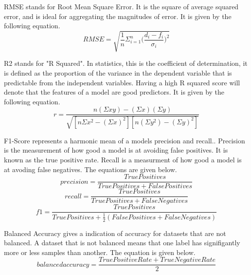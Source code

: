 \par
RMSE stands for Root Mean Square Error.
It is the square of average squared error, and is ideal for aggregating the magnitudes of error.
It is given by the following equation.
\begin{equation}
    RMSE = \sqrt{\frac{1}{n}\Sigma_{i=1}^{n}{\Big(\frac{d_i -f_i}{\sigma_i}\Big)^2}}
\end{equation}

\par
R2 stands for "R Squared".
In statistics, this is the coefficient of determination, it is defined as the proportion of the variance in the dependent variable that is predictable from the independent variables.
Having a high R squared score will denote that the features of a model are good predictors.
It is given by the following equation.
\begin{equation}
    r = \frac{n(\Sigma x y)-(\Sigma x)(\Sigma y)}{\sqrt{[n \Sigma x^2  - (\Sigma x)^2][n(\Sigma y^2) - (\Sigma y)^2]}}
\end{equation}

\par
F1-Score represents a harmonic mean of a models precision and recall..
Precision is the measurement of how good a model is at avoiding false positives.
It is known as the true positive rate.
Recall is a measurment of how good a model is at avoding false negatives.
The equations are given below.
\begin{equation}
    precision = \frac{True Positives}{True Positives + False Positives}
\end{equation}
\begin{equation}
    recall = \frac{True Positives}{True Positives + False Negatives}
\end{equation}
\begin{equation}
    f1 = \frac{True Positives}{True Positives + \frac{1}{2}(False Positives + False Negatives)}
\end{equation}

\par
Balanced Accuracy gives a indication of accuracy for datasets that are not balanced.
A dataset that is not balanced means that one label has signifigantly more or less samples than another.
The equation is given below.
\begin{equation}
    balanced accuracy = \frac{True Positive Rate + True Negative Rate}{2}
\end{equation}




